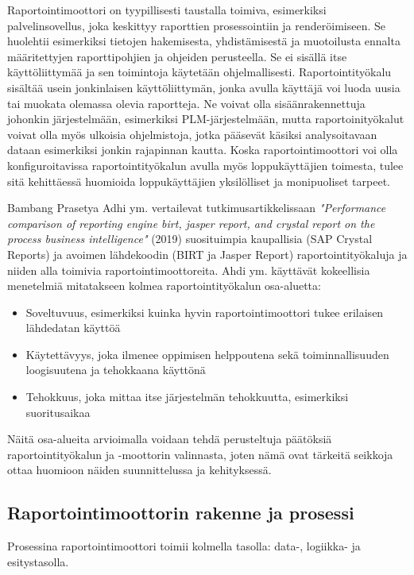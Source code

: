 Raportointimoottori on tyypillisesti taustalla toimiva, esimerkiksi palvelinsovellus, joka keskittyy raporttien prosessointiin ja renderöimiseen. Se huolehtii esimerkiksi tietojen hakemisesta, yhdistämisestä ja muotoilusta ennalta määritettyjen raporttipohjien ja ohjeiden perusteella. Se ei sisällä itse käyttöliittymää ja sen toimintoja käytetään ohjelmallisesti. Raportointityökalu sisältää usein jonkinlaisen käyttöliittymän, jonka avulla käyttäjä voi luoda uusia tai muokata olemassa olevia raportteja. Ne voivat olla sisäänrakennettuja johonkin järjestelmään, esimerkiksi PLM-järjestelmään, mutta raportoinityökalut voivat olla myös ulkoisia ohjelmistoja, jotka pääsevät käsiksi analysoitavaan dataan esimerkiksi jonkin rajapinnan kautta. Koska raportointimoottori voi olla konfiguroitavissa raportointityökalun avulla myös loppukäyttäjien toimesta, tulee sitä kehittäessä huomioida loppukäyttäjien yksilölliset ja monipuoliset tarpeet. \cite{adhi_performance_2019}

Bambang Prasetya Adhi ym. vertailevat tutkimusartikkelissaan \textit{"Performance comparison of reporting engine birt, jasper report, and crystal report on the process business intelligence"} (2019)  \cite{adhi_performance_2019} suosituimpia kaupallisia (SAP Crystal Reports) ja avoimen lähdekoodin (BIRT ja Jasper Report) raportointityökaluja ja niiden alla toimivia raportointimoottoreita. Ahdi ym. käyttävät kokeellisia menetelmiä mitatakseen kolmea raportointityökalun osa-aluetta:
\begin{itemize}
\item Soveltuvuus, esimerkiksi kuinka hyvin raportointimoottori tukee erilaisen lähdedatan käyttöä
\item Käytettävyys, joka ilmenee oppimisen helppoutena sekä toiminnallisuuden loogisuutena ja tehokkaana käyttönä
\item Tehokkuus, joka mittaa itse järjestelmän tehokkuutta, esimerkiksi suoritusaikaa
\end{itemize}
Näitä osa-alueita arvioimalla voidaan tehdä perusteltuja päätöksiä raportointityökalun ja -moottorin valinnasta, joten nämä ovat tärkeitä seikkoja ottaa huomioon näiden suunnittelussa ja kehityksessä.

\subsection{Raportointimoottorin rakenne ja prosessi} \label{Raportointimoottorin rakenne ja prosessi}

Prosessina raportointimoottori toimii kolmella tasolla: data-, logiikka- ja esitystasolla. \cite{he_design_2010}

